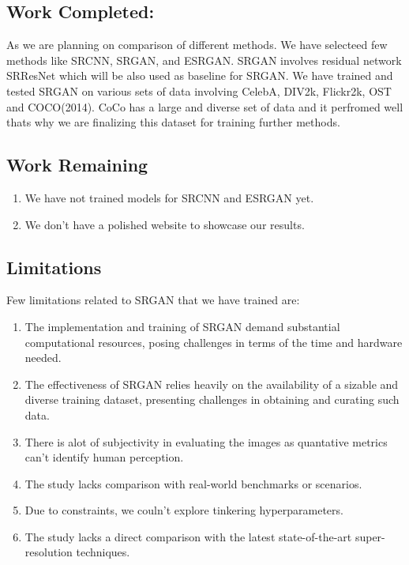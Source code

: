 \subsection{Work Completed:}
As we are planning on comparison of different methods. We have selecteed few methods like SRCNN, SRGAN, and ESRGAN. SRGAN involves residual network SRResNet which will be also used as baseline for SRGAN. We have trained and tested SRGAN on various sets of data involving CelebA, DIV2k, Flickr2k, OST and COCO(2014). CoCo has a large and diverse set of data and it perfromed well thats why we are finalizing this dataset for training further methods. 
\subsection{Work Remaining}
\begin{enumerate}
    \item We have not trained models for SRCNN and ESRGAN yet.
    \item We don't have a polished website to showcase our results.
\end{enumerate}  
\subsection{Limitations}
Few limitations related to SRGAN that we have trained are:
\begin{enumerate}
    \item The implementation and training of SRGAN demand substantial computational resources, posing challenges in terms of the time and hardware needed.
    \item  The effectiveness of SRGAN relies heavily on the availability of a sizable and diverse training dataset, presenting challenges in obtaining and curating such data.
    \item There is alot of subjectivity in evaluating the images as quantative metrics can't identify human perception.
    \item  The study lacks comparison with real-world benchmarks or scenarios.
    \item Due to constraints, we couln't explore tinkering hyperparameters.
    \item The study lacks a direct comparison with the latest state-of-the-art super-resolution techniques.
\end{enumerate}
